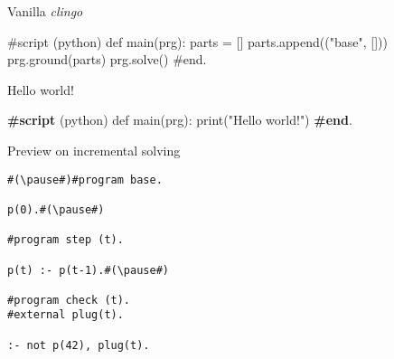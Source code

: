 \begin{frame}[fragile,c]{Vanilla \textit{clingo}}
  \pause
  \begin{center}
    \begin{minipage}{0.5\linewidth}
\begin{semiverbatim}
\alert<2>{#script} (python)
def \alert<3>{main}(prg):
    parts = []
    parts.append(("base", []))
    prg.\alert<3>{ground}(parts)
    prg.\alert<3>{solve}()
\alert<2>{#end}.
\end{semiverbatim}
    \end{minipage}
  \end{center}
\end{frame}
\begin{frame}[fragile,c]{Hello world!}

\begin{center}
\begin{minipage}{0.5\linewidth}
\begin{semiverbatim}
{\bf{}#script} (python)
def \alert<3>{main}(prg):
    print("Hello world!")
{\bf{}#end}.
\end{semiverbatim}
\end{minipage}

\bigskip\pause\bigskip

\begin{minipage}{0.95\linewidth}\footnotesize
{}
\end{minipage}
\end{center}
\end{frame}
\begin{frame}[fragile,c]{Preview on incremental solving}
\begin{lstlisting}
#(\pause#)#program base.

p(0).#(\pause#)

#program step (t).

p(t) :- p(t-1).#(\pause#)

#program check (t).
#external plug(t).

:- not p(42), plug(t).
\end{lstlisting}
\end{frame}
